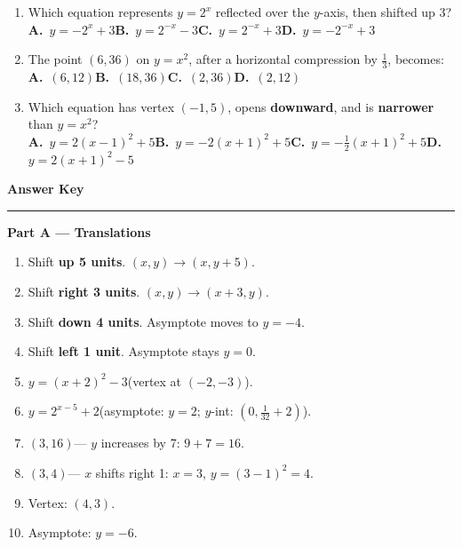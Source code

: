 \documentclass[12pt]{article}
\begin{document}
\begin{enumerate}[label=\textbf{D\arabic*.},leftmargin=*,itemsep=16pt]
\item Which equation represents $y=2^x$ reflected over the $y$-axis, then shifted up 3?\\[5pt]
\textbf{A.}\ $y=-2^x+3$\qquad \textbf{B.}\ $y=2^{-x}-3$\qquad \textbf{C.}\ $y=2^{-x}+3$\qquad \textbf{D.}\ $y=-2^{-x}+3$

\item The point $(6,36)$ on $y=x^2$, after a horizontal compression by $\tfrac{1}{3}$, becomes:\\[5pt]
\textbf{A.}\ $(6,12)$\qquad \textbf{B.}\ $(18,36)$\qquad \textbf{C.}\ $(2,36)$\qquad \textbf{D.}\ $(2,12)$

\item Which equation has vertex $(-1,5)$, opens \textbf{downward}, and is \textbf{narrower} than $y=x^2$?\\[5pt]
\textbf{A.}\ $y=2(x-1)^2+5$\quad \textbf{B.}\ $y=-2(x+1)^2+5$\quad \textbf{C.}\ $y=-\tfrac{1}{2}(x+1)^2+5$\quad \textbf{D.}\ $y=2(x+1)^2-5$

\end{enumerate}

\newpage
\begin{center}{\LARGE\textbf{Answer Key}}\end{center}
\hrule\vspace{0.7em}

\begin{mdframed}[backgroundcolor=purplelight,linecolor=purplemain,linewidth=1.2pt,innerleftmargin=8pt]
{\large\textbf{Part A --- Translations}}
\end{mdframed}
\begin{enumerate}[label=\textbf{A\arabic*.},leftmargin=*,itemsep=4pt]
\item Shift \textbf{up 5 units}. $(x,y)\to(x,y+5)$.
\item Shift \textbf{right 3 units}. $(x,y)\to(x+3,y)$.
\item Shift \textbf{down 4 units}. Asymptote moves to $y=-4$.
\item Shift \textbf{left 1 unit}. Asymptote stays $y=0$.
\item $y=(x+2)^2-3$\quad (vertex at $(-2,-3)$).
\item $y=2^{x-5}+2$\quad (asymptote: $y=2$; $y$-int: $(0,\tfrac{1}{32}+2)$).
\item $(3,16)$\quad --- $y$ increases by 7: $9+7=16$.
\item $(3,4)$\quad --- $x$ shifts right 1: $x=3$, $y=(3-1)^2=4$.
\item Vertex: $(4,3)$.
\item Asymptote: $y=-6$.
\end{enumerate}
\end{document}
